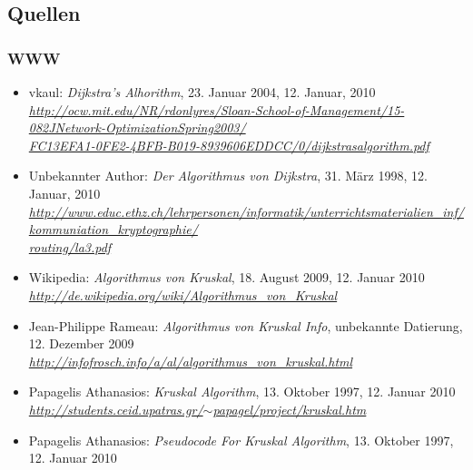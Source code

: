 \documentclass[a4paper,titlepage]{article}
\begin{document}
\subsection{Quellen}

\subsubsection{WWW}

\begin{itemize}
\item vkaul: \emph{Dijkstra's Alhorithm}, 23. Januar 2004, 12. Januar, 2010 \\
	\emph{\href{http://ocw.mit.edu/NR/rdonlyres/Sloan-School-of-Management/15-082JNetwork-OptimizationSpring2003/FC13EFA1-0FE2-4BFB-B019-8939606EDDCC/0/dijkstrasalgorithm.pdf}{http://ocw.mit.edu/NR/rdonlyres/Sloan-School-of-Management/15-082JNetwork-OptimizationSpring2003/ \\
	FC13EFA1-0FE2-4BFB-B019-8939606EDDCC/0/dijkstrasalgorithm.pdf}}
\item Unbekannter Author: \emph{Der Algorithmus von Dijkstra}, 31. März 1998, 12. Januar, 2010 \\
	\emph{\href{http://www.educ.ethz.ch/lehrpersonen/informatik/unterrichtsmaterialien_inf/kommuniation_kryptographie/routing/la3.pdf}{http://www.educ.ethz.ch/lehrpersonen/informatik/unterrichtsmaterialien\_inf/kommuniation\_kryptographie/ \\
	routing/la3.pdf}}
\item Wikipedia: \emph{Algorithmus von Kruskal}, 18. August 2009, 12. Januar 2010 \\
	\emph{\href{http://de.wikipedia.org/wiki/Algorithmus_von_Kruskal}{http://de.wikipedia.org/wiki/Algorithmus\_von\_Kruskal}}
\item Jean-Philippe Rameau: \emph{Algorithmus von Kruskal Info}, unbekannte Datierung, 12. Dezember 2009 \\
	\emph{\href{http://infofrosch.info/a/al/algorithmus_von_kruskal.html}{http://infofrosch.info/a/al/algorithmus\_von\_kruskal.html}}
\item Papagelis Athanasios: \emph{Kruskal Algorithm}, 13. Oktober 1997, 12. Januar 2010 \\
	\emph{\href{http://students.ceid.upatras.gr/~papagel/project/kruskal.htm}{http://students.ceid.upatras.gr/$\sim$papagel/project/kruskal.htm}}
\item Papagelis Athanasios: \emph{Pseudocode For Kruskal Algorithm}, 13. Oktober 1997, 12. Januar 2010 \\

\end{itemize}
\end{document}
